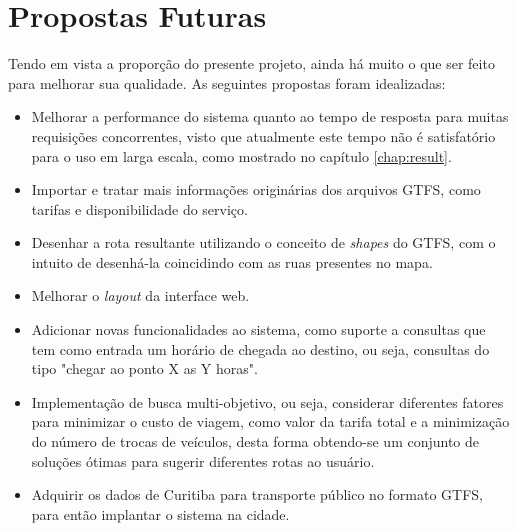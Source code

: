 \section{Propostas Futuras}

Tendo em vista a proporção do presente projeto, ainda há muito o que ser feito para melhorar sua qualidade.
As seguintes propostas foram idealizadas:

\begin{itemize}
	\item Melhorar a performance do sistema quanto ao tempo de resposta para muitas requisições concorrentes, visto que atualmente este tempo não é satisfatório para 	o uso em larga escala, como mostrado no capítulo \ref{chap:result}.
	\item Importar e tratar mais informações originárias dos arquivos GTFS, como tarifas e disponibilidade do serviço.
	\item Desenhar a rota resultante utilizando o conceito de \emph{shapes} do GTFS, com o intuito de desenhá-la coincidindo com as ruas presentes no mapa.
	\item Melhorar o \emph{layout} da interface web.
	\item Adicionar novas funcionalidades ao sistema, como suporte a consultas que tem como entrada um horário de chegada ao destino, ou seja, consultas do tipo 			"chegar ao ponto X as Y horas".
	\item Implementação de busca multi-objetivo, ou seja, considerar diferentes fatores para minimizar o custo de viagem, como valor da tarifa total e a minimização 		do número de trocas de veículos, desta forma obtendo-se um conjunto de soluções ótimas para sugerir diferentes rotas ao usuário.
	\item Adquirir os dados de Curitiba para transporte público no formato GTFS, para então implantar o sistema na cidade.
\end{itemize}
